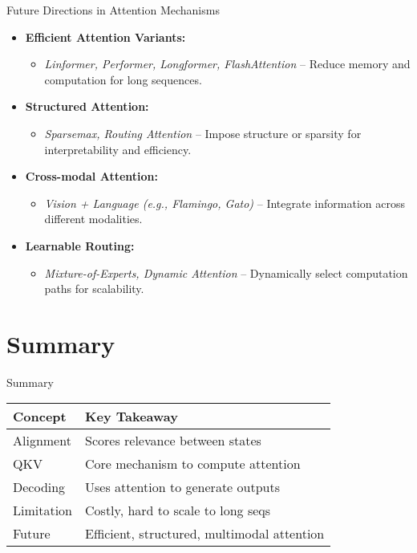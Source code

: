 \begin{frame}{Future Directions in Attention Mechanisms}
    \begin{itemize}
        \item \textbf{Efficient Attention Variants:}
        \begin{itemize}
            \item \textit{Linformer, Performer, Longformer, FlashAttention} – Reduce memory and computation for long sequences.
        \end{itemize}
        \item \textbf{Structured Attention:}
        \begin{itemize}
            \item \textit{Sparsemax, Routing Attention} – Impose structure or sparsity for interpretability and efficiency.
        \end{itemize}
        \item \textbf{Cross-modal Attention:}
        \begin{itemize}
            \item \textit{Vision + Language (e.g., Flamingo, Gato)} – Integrate information across different modalities.
        \end{itemize}
        \item \textbf{Learnable Routing:}
        \begin{itemize}
            \item \textit{Mixture-of-Experts, Dynamic Attention} – Dynamically select computation paths for scalability.
        \end{itemize}
    \end{itemize}
\end{frame}

\section{Summary}
\begin{frame}{Summary}
    \begin{table}[h!]
        \centering
        \renewcommand{\arraystretch}{1.8} 
        \begin{tabular}{lp{}}
            \hline
            \textbf{Concept} & \textbf{Key Takeaway} \\
            \hline
            Alignment & Scores relevance between states \\
            QKV & Core mechanism to compute attention \\
            Decoding & Uses attention to generate outputs \\
            Limitation & Costly, hard to scale to long seqs \\
            Future & Efficient, structured, multimodal attention \\
            \hline
        \end{tabular}
    \end{table}
\end{frame}

